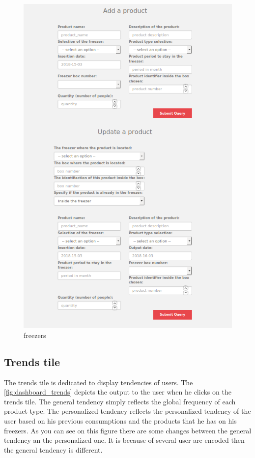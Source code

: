 \begin{figure}[H]
\centering
\includegraphics[scale=0.35]{./images/dashboard_products2.png}
\caption{freezers}
\label{fig:dashboard_products2}
\end{figure}

\subsection{Trends tile}
The trends tile is dedicated to display tendencies of users. The \autoref{fig:dashboard_trends} depicts the output to the user when he clicks on the trends tile. The general tendency simply reflects the global frequency of each product type. The personalized tendency reflects the personalized tendency of the user based on his previous consumptions and the products that he has on his freezers. As you can see on this figure there are some changes between the general tendency an the personalized one. It is because of several user are encoded then the general tendency is different.

